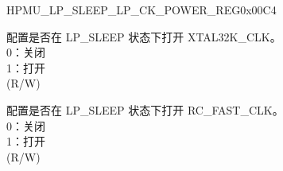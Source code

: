 \begin{register}{H}{PMU\_LP\_SLEEP\_LP\_CK\_POWER\_REG}{0x00C4}\label{regdesc:PMULPSLEEPLPCKPOWERREG}
%
%
%
%
%
\regnewline%
\begin{regdesc}\begin{reglist}
\label{fielddesc:PMULPSLEEPXPDXTAL32K}\item [PMU\_LP\_SLEEP\_XPD\_XTAL32K] 配置是否在 LP\_SLEEP 状态下打开 XTAL32K\_CLK。\\
0：关闭\\
1：打开\\
(R/W)

\label{fielddesc:PMULPSLEEPXPDFOSCCLK}\item [PMU\_LP\_SLEEP\_XPD\_FOSC\_CLK] 配置是否在 LP\_SLEEP 状态下打开 RC\_FAST\_CLK。\\
0：关闭\\
1：打开\\
(R/W)
\end{reglist}\end{regdesc}
\end{register}


